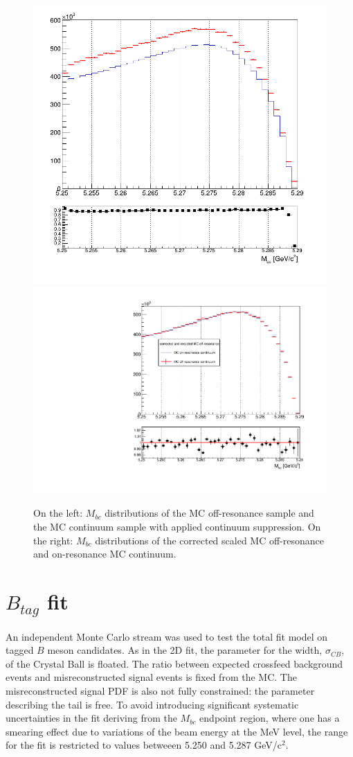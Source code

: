 \begin{figure}[H]
 \centering
\subcaptionbox{\label{fig:stream0_chargedBtag_off-on_resonance_correct}}
{\includegraphics[width=.45\textwidth]{05-BtagFit/figs/stream0_chargedBtag_off-on_resonance_correct.png}}
\subcaptionbox{\label{fig:bin_corrected_stream1_off-resonance_on_stream0_on-resonance}}
{\includegraphics[width=.45\textwidth]{05-BtagFit/figs/bin_corrected_stream1_off-resonance_on_stream0_on-resonance.pdf}} 
\caption{On the left: $M_{bc}$ distributions of the MC off-resonance sample and the MC continuum sample with applied continuum suppression. On the right: $M_{bc}$ distributions of the corrected scaled MC off-resonance and on-resonance MC continuum.}
\end{figure}



\newpage
\section{ $B_{tag}$ fit}\label{BtagFit_onMC}
An independent Monte Carlo stream was used to test the total fit model on tagged $B$ meson candidates.
As in the 2D fit, the parameter for the width, $\sigma_{CB}$, of the Crystal Ball is floated. 
The ratio between expected crossfeed background events and  misreconstructed signal events is fixed from the MC. 
The misreconstructed signal PDF is also not fully constrained: the parameter describing the tail is free. 
To avoid introducing significant systematic uncertainties in the fit deriving from the $M_{bc}$ endpoint region, where one has a smearing effect due to variations of the
beam energy at the MeV level, the range for the fit is restricted to values betweeen 5.250 and 5.287 GeV/c$^2$.


